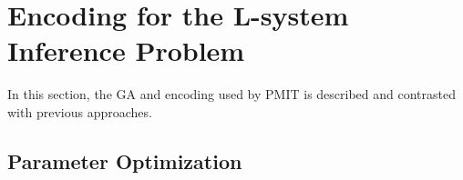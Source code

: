 \documentclass{llncs}
\begin{document}
	
	
	\section{Encoding for the L-system Inference Problem}
	
	In this section, the GA and encoding used by PMIT is described and contrasted with previous approaches.
	
	\subsection{Parameter Optimization}
	
\end{document}
